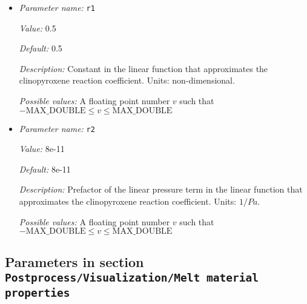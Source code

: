 \begin{itemize}
{\it Value:} 1.5


{\it Default:} 1.5


{\it Description:} Exponent of the melting temperature in the melt fraction calculation. Units: non-dimensional.


{\it Possible values:} A floating point number $v$ such that $-\text{MAX\_DOUBLE} \leq v \leq \text{MAX\_DOUBLE}$
\item {\it Parameter name:} {\tt r1}
\label{parameters:Postprocess/Visualization/Melt fraction/r1}


{\it Value:} 0.5


{\it Default:} 0.5


{\it Description:} Constant in the linear function that approximates the clinopyroxene reaction coefficient. Units: non-dimensional.


{\it Possible values:} A floating point number $v$ such that $-\text{MAX\_DOUBLE} \leq v \leq \text{MAX\_DOUBLE}$
\item {\it Parameter name:} {\tt r2}
\label{parameters:Postprocess/Visualization/Melt fraction/r2}


{\it Value:} 8e-11


{\it Default:} 8e-11


{\it Description:} Prefactor of the linear pressure term in the linear function that approximates the clinopyroxene reaction coefficient. Units: $1/Pa$.


{\it Possible values:} A floating point number $v$ such that $-\text{MAX\_DOUBLE} \leq v \leq \text{MAX\_DOUBLE}$
\end{itemize}

\subsection{Parameters in section \tt Postprocess/Visualization/Melt material properties}
\label{parameters:Postprocess/Visualization/Melt_20material_20properties}

